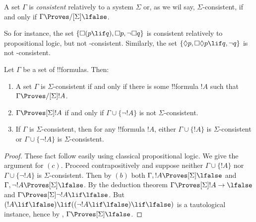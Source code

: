 \documentclass[../../../include/open-logic-section]{subfiles}
\begin{document}


\begin{defn}
  A set $\Gamma$ is \emph{consistent} relatively to a system
  $\Sigma$ or, as we wil say, $\Sigma$-consistent, if and only if
  $\Gamma \Proves/[\Sigma] \lfalse$.
\end{defn}

So for instance, the set $\{ \Box(p \lif q), \Box p, \lnot\Box q \}$ is
consistent relatively to propositional logic, but not
-consistent. Similarly, the set $\{ \Diamond p, \Box\Diamond
p \lif q, \lnot q \}$ is not -consistent.

\begin{prop}
  Let $\Gamma$ be a set of !!{formula}s. Then:
  \begin{enumerate}
  \item A set $\Gamma$ is $\Sigma$-consistent if and only if there is
    some !!{formula} $!A$ such that $\Gamma \Proves/[\Sigma]
    !A$.
  \item {}%
    $\Gamma \Proves[\Sigma] !A$ if and only if $\Gamma \cup \{
    \lnot!A \}$ is not $\Sigma$-consistent.
  \item {}%
    If $\Gamma$ is $\Sigma$-consistent, then for any !!{formula}
    $!A$, either $\Gamma \cup \{ !A \}$ is
    $\Sigma$-consistent or $\Gamma \cup \{ \lnot!A \}$ is
    $\Sigma$-consistent.
  \end{enumerate}
\end{prop}

\begin{proof}
  These fact follow easily using classical propositional logic. We
  give the argument for $(c)$. Proceed contrapositively and suppose
  neither $\Gamma \cup \{ !A \}$ nor $\Gamma \cup \{ \lnot!A \}$ is
  $\Sigma$-consistent. Then by $(b)$ both $\Gamma, !A \Proves[\Sigma]
  \lfalse$ and $\Gamma, \lnot !A \Proves[\Sigma] \lfalse$. By the
  deduction theorem $\Gamma \Proves[\Sigma] !A \to \lfalse$ and
  $\Gamma \Proves[\Sigma] \lnot!A \lif \lfalse$. But $(!A \lif
  \lfalse) \lif ((\lnot!A \lif \lfalse) \lif \lfalse)$ is a
  tautological instance, hence by
  ,
  $\Gamma \Proves[\Sigma] \lfalse$.
\end{proof}
\end{document}
